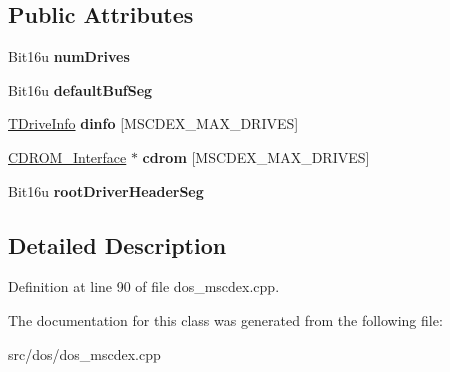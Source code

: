 \subsection*{Public Attributes}
\begin{DoxyCompactItemize}
\item 
\hypertarget{classCMscdex_a5b4d6334bdd6f14e75354d225c865abe}{Bit16u {\bfseries num\-Drives}}\label{classCMscdex_a5b4d6334bdd6f14e75354d225c865abe}

\item 
\hypertarget{classCMscdex_a74017c503ae2c44e5c78bfd3190005f8}{Bit16u {\bfseries default\-Buf\-Seg}}\label{classCMscdex_a74017c503ae2c44e5c78bfd3190005f8}

\item 
\hypertarget{classCMscdex_a1392c8b86d5976dafb60694eef28abfa}{\hyperlink{structCMscdex_1_1SDriveInfo}{T\-Drive\-Info} {\bfseries dinfo} \mbox{[}M\-S\-C\-D\-E\-X\-\_\-\-M\-A\-X\-\_\-\-D\-R\-I\-V\-E\-S\mbox{]}}\label{classCMscdex_a1392c8b86d5976dafb60694eef28abfa}

\item 
\hypertarget{classCMscdex_aaadae67160be26c0a1bf0646a8030803}{\hyperlink{classCDROM__Interface}{C\-D\-R\-O\-M\-\_\-\-Interface} $\ast$ {\bfseries cdrom} \mbox{[}M\-S\-C\-D\-E\-X\-\_\-\-M\-A\-X\-\_\-\-D\-R\-I\-V\-E\-S\mbox{]}}\label{classCMscdex_aaadae67160be26c0a1bf0646a8030803}

\item 
\hypertarget{classCMscdex_a9dcc1cbe3482842e279f49d816fa3aaf}{Bit16u {\bfseries root\-Driver\-Header\-Seg}}\label{classCMscdex_a9dcc1cbe3482842e279f49d816fa3aaf}

\end{DoxyCompactItemize}


\subsection{Detailed Description}


Definition at line 90 of file dos\-\_\-mscdex.\-cpp.



The documentation for this class was generated from the following file\-:\begin{DoxyCompactItemize}
\item 
src/dos/dos\-\_\-mscdex.\-cpp\end{DoxyCompactItemize}
